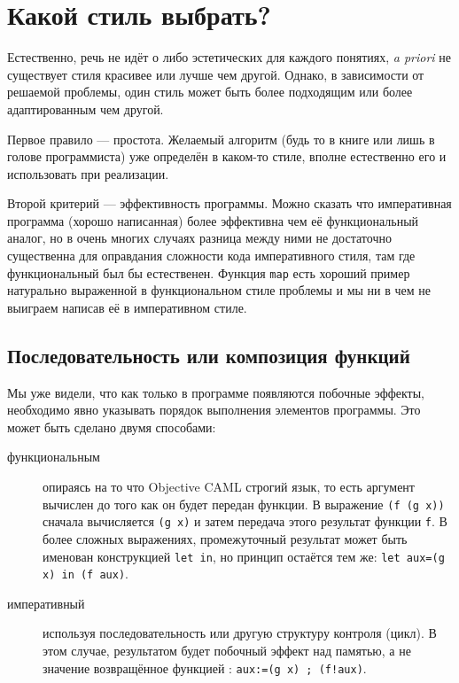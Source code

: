 \section{Какой стиль выбрать?}
\label{sec:which_style_to_choose}

Естественно, речь не идёт о  либо эстетических для каждого
понятиях, {\it a priori} не существует стиля красивее или лучше чем другой.
Однако, в зависимости от решаемой проблемы, один стиль может быть более
подходящим или более адаптированным чем другой.

Первое правило --- простота. Желаемый алгоритм (будь то в книге или лишь в
голове программиста) уже определён в каком-то стиле, вполне естественно его и
использовать при реализации.

Второй критерий --- эффективность программы. Можно сказать что императивная
программа (хорошо написанная) более эффективна чем её функциональный аналог, но
в очень многих случаях разница между ними не достаточно существенна для
оправдания сложности кода императивного стиля, там где функциональный был бы
естественен. Функция \texttt{map} есть хороший пример натурально выраженной в
функциональном стиле проблемы и мы ни в чем не выиграем написав её в
императивном стиле.

\subsection{Последовательность или композиция функций}
\label{subsec:sequence_or_composition_of_functions}

Мы уже видели, что как только в программе появляются побочные эффекты,
необходимо явно указывать порядок выполнения элементов программы. Это может быть
сделано двумя способами:

\begin{description}
	\item [функциональным] опираясь на то что Objective CAML строгий язык, то
есть аргумент вычислен до того как он будет передан функции. В выражение
\texttt{(f (g x))} сначала вычисляется \texttt{(g x)} и затем передача этого
результат функции \texttt{f}. В более сложных выражениях, промежуточный
результат может быть именован конструкцией \texttt{let in}, но принцип остаётся
тем же: \texttt{let aux=(g x) in (f aux)}.

	\item [императивный] используя последовательность или другую структуру
контроля (цикл). В этом случае, результатом будет побочный эффект над памятью, а
не значение возвращённое функцией : \texttt{aux:=(g x) ; (f!aux)}.
\end{description}

